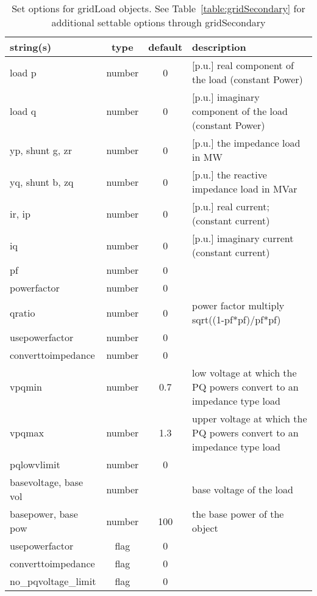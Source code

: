\begin{table}[ht]
\centering
\begin{tabular}{p{5cm} c c p{7cm}}
\hline
string(s) & type & default & description \\
\hline
load p & number & 0 & [p.u.] real component of the load (constant Power)\\
load q & number & 0 & [p.u.] imaginary component of the load (constant Power)\\
yp, shunt g, zr & number & 0 & [p.u.] the impedance load in MW\\
yq, shunt b, zq & number & 0 & [p.u.]  the reactive impedance load in MVar\\
ir, ip & number & 0 & [p.u.] real current; (constant current)\\
iq & number & 0 & [p.u.] imaginary current (constant current)\\
pf & number & 0 & \\
powerfactor & number & 0 & \\
qratio & number & 0 & power factor multiply  sqrt((1-pf*pf)/pf*pf)\\
usepowerfactor & number & 0 & \\
converttoimpedance & number & 0 & \\
vpqmin & number & 0.7 & low voltage at which the PQ powers convert to an impedance type load\\
vpqmax & number & 1.3 & upper voltage at which the PQ powers convert to an impedance type load\\
pqlowvlimit & number & 0 & \\
basevoltage, base vol & number &  & base voltage of the load\\
basepower, base pow & number & 100 & the base power of the object\\
usepowerfactor & flag & 0 & \\
converttoimpedance & flag & 0 & \\
no\_pqvoltage\_limit & flag & 0 & \\
\hline
\end{tabular}
\caption{Set options for gridLoad objects. See Table~\ref{table:gridSecondary} for additional settable options through gridSecondary}
\label{table:gridLoad}
\end{table}

